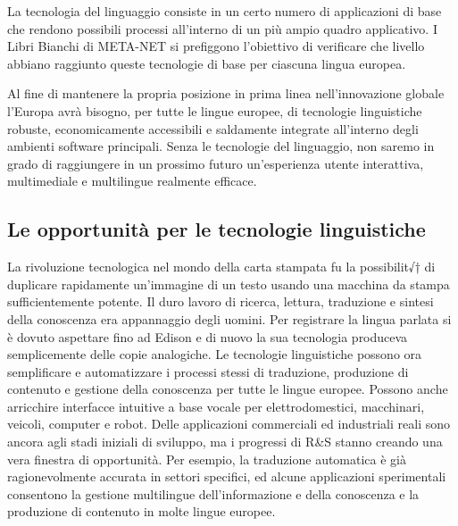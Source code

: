 \begin{multicols}{2}
La tecnologia del linguaggio consiste in un certo numero di applicazioni di
base che rendono possibili processi all'interno di un pi\`{u} ampio quadro
applicativo. I Libri Bianchi di META-NET si prefiggono l'obiettivo di
verificare che livello abbiano raggiunto queste tecnologie di base per
ciascuna lingua europea.


Al fine di mantenere la propria posizione in prima linea nell'innovazione
globale l'Europa avr\`{a} bisogno, per tutte le lingue europee, di tecnologie
linguistiche robuste, economicamente accessibili e saldamente integrate
all'interno degli ambienti software principali. Senza le tecnologie del
linguaggio, non saremo in grado di raggiungere in un prossimo futuro
un'esperienza utente interattiva, multimediale e multilingue realmente
efficace.

\subsection{Le opportunit\`{a} per le tecnologie linguistiche}

La rivoluzione tecnologica nel mondo della carta stampata fu la possibilit√† di 
duplicare rapidamente un'immagine di un testo usando una
macchina da stampa sufficientemente potente. Il duro lavoro di ricerca,
lettura, traduzione e sintesi della conoscenza era appannaggio degli
uomini. Per registrare la lingua parlata si \`{e} dovuto aspettare fino ad
Edison e di nuovo la sua tecnologia produceva semplicemente delle copie
analogiche. Le tecnologie linguistiche possono ora semplificare e automatizzare i processi
stessi di traduzione, produzione di contenuto e gestione della conoscenza per
tutte le lingue europee. Possono anche arricchire interfacce intuitive a base
vocale per elettrodomestici, macchinari, veicoli, computer e
robot. Delle applicazioni commerciali ed industriali reali sono ancora agli
stadi iniziali di sviluppo, ma i progressi di R\&S stanno creando una vera
finestra di opportunit\`{a}. Per esempio, la traduzione automatica \`{e}
gi\`{a} ragionevolmente accurata in settori specifici, ed alcune applicazioni
sperimentali consentono la gestione multilingue dell'informazione e della
conoscenza e la produzione di contenuto in molte lingue europee. 


\end{multicols}
